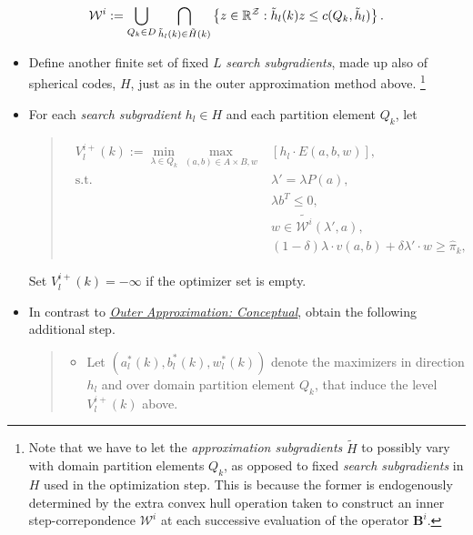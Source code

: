 \documentclass[a4paper,10pt,english]{sphinxmanual}
\begin{document}
\begin{gather}
\begin{split}\mathcal{W}^{i} := \bigcup_{Q_k \in D}  \bigcap_{\tilde{h}_l (k) \in \tilde{H}(k)}
\left\{ z \in \mathbb{R}^{\mathcal{Z}} :
\tilde{h}_l (k) z \leq c(Q_k,\tilde{h}_l) \right\}.\end{split}\notag
\end{gather}\begin{itemize}
\item {} 
Define another finite set of fixed \(L\) \emph{search subgradients}, made up also of
spherical codes, \(H\), just as in the outer approximation method above. \footnote{
Note that we have to let the \emph{approximation subgradients} \(\tilde{H}\) to possibly vary with domain partition elements \(Q_k\), as opposed to fixed \emph{search subgradients} in \(H\) used in the optimization step. This is because the former is endogenously determined by the extra convex hull operation taken to construct an inner step-correpondence \(\mathcal{W}^{i}\) at each successive evaluation of the operator \(\mathbf{B}^i\).
}

\item {} 
For each \emph{search subgradient} \(h_l\in H\) and each partition element
\(Q_k\), let
\begin{quote}
\label{payoff_compute:equation-InnerBLP}\begin{gather}
\begin{split}V^{i+}_l(k):=\min_{\lambda\in Q_k} \max_{(a,b) \in A \times B, w}& [h_l \cdot E(a,b,w)],
\\
\text{s.t.}\,\,&\lambda'=\lambda P(a),
\\
& \lambda b^T \leq 0,
\\
& w\in \tilde{\mathcal{W}^i}(\lambda',a),
\\
& (1-\delta)\lambda \cdot v(a,b)+\delta \lambda' \cdot w\geq \hat{\pi}_k,\end{split}\label{payoff_compute-InnerBLP}
\end{gather}\end{quote}

Set \(V^{i+}_l(k) = -\infty\) if the optimizer set is empty.

\item {} 
In contrast to {\hyperref[payoff_compute:outer-concept]{\emph{Outer Approximation: Conceptual}}}, obtain the following additional
step.
\begin{quote}
\begin{itemize}
\item {} 
Let \((a_{l}^{\ast}(k), b_{l}^{\ast}(k), w_{l}^{\ast}(k))\) denote the maximizers in direction \(h_l\) and over domain partition element \(Q_k\), that induce the level \(V^{i+}_l(k)\) above.


\end{itemize}
\end{quote}
\end{itemize}
\end{document}
